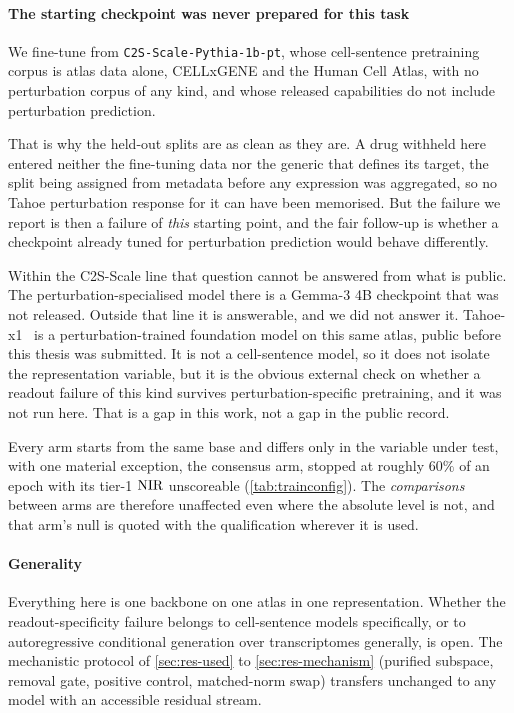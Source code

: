 \paragraph{The starting checkpoint was never prepared for this task} We
fine-tune from \texttt{C2S-Scale-Pythia-1b-pt}, whose cell-sentence pretraining
corpus is atlas data alone, CELLxGENE and the Human Cell Atlas, with no
perturbation corpus of any kind, and whose released capabilities do not include
perturbation prediction.

That is why the held-out splits are as clean as they are. A drug withheld here
entered neither the fine-tuning data nor the generic that defines its target,
the split being assigned from metadata before any expression was aggregated, so
no Tahoe perturbation response for it can have been memorised. But the failure
we report is then a failure of \emph{this} starting point, and the fair
follow-up is whether a checkpoint already tuned for perturbation prediction
would behave differently.

Within the C2S-Scale line that question cannot be answered from what is public.
The perturbation-specialised model there is a Gemma-3 4B checkpoint that was not
released. Outside that line it is answerable, and we did not answer it.
Tahoe-x1~\cite{tahoex1} is a perturbation-trained foundation model on this same
atlas, public before this thesis was submitted. It is not a cell-sentence model,
so it does not isolate the representation variable, but it is the obvious
external check on whether a readout failure of this kind survives
perturbation-specific pretraining, and it was not run here. That is a gap in
this work, not a gap in the public record.

Every arm starts from the same base and differs only in the variable under test,
with one material exception, the consensus arm, stopped at roughly $60\%$ of an
epoch with its tier-1 $\textrm{NIR}$ unscoreable (\cref{tab:trainconfig}). The
\emph{comparisons} between arms are therefore unaffected even where the absolute
level is not, and that arm's null is quoted with the qualification wherever it
is used.

\paragraph{Generality} Everything here is one backbone on one atlas in one
representation. Whether the readout-specificity failure belongs to cell-sentence
models specifically, or to autoregressive conditional generation over
transcriptomes generally, is open. The mechanistic protocol of
\cref{sec:res-used} to \cref{sec:res-mechanism} (purified subspace, removal
gate, positive control, matched-norm swap) transfers unchanged to any model
with an accessible residual stream.
